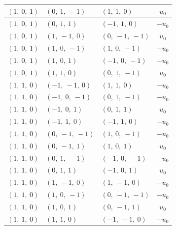 \documentclass[11pt]{article}
\theoremstyle{definition}
\begin{document}
\begin{longtable}{|l|l|l|c|}
    \hline
    $\left( 1, \  0, \  1\right)$ & $\left( 0, \  1, \  -1\right)$ & $\left( 1, \  1, \  0\right)$ & $u_{0}$ \\
    \hline
    $\left( 1, \  0, \  1\right)$ & $\left( 0, \  1, \  1\right)$ & $\left( -1, \  1, \  0\right)$ & $- u_{0}$ \\
    \hline
    $\left( 1, \  0, \  1\right)$ & $\left( 1, \  -1, \  0\right)$ & $\left( 0, \  -1, \  -1\right)$ & $u_{0}$ \\
    \hline
    $\left( 1, \  0, \  1\right)$ & $\left( 1, \  0, \  -1\right)$ & $\left( 1, \  0, \  -1\right)$ & $- u_{0}$ \\
    \hline
    $\left( 1, \  0, \  1\right)$ & $\left( 1, \  0, \  1\right)$ & $\left( -1, \  0, \  -1\right)$ & $- u_{0}$ \\
    \hline
    $\left( 1, \  0, \  1\right)$ & $\left( 1, \  1, \  0\right)$ & $\left( 0, \  1, \  -1\right)$ & $u_{0}$ \\
    \hline
    $\left( 1, \  1, \  0\right)$ & $\left( -1, \  -1, \  0\right)$ & $\left( 1, \  1, \  0\right)$ & $- u_{0}$ \\
    \hline
    $\left( 1, \  1, \  0\right)$ & $\left( -1, \  0, \  -1\right)$ & $\left( 0, \  1, \  -1\right)$ & $- u_{0}$ \\
    \hline
    $\left( 1, \  1, \  0\right)$ & $\left( -1, \  0, \  1\right)$ & $\left( 0, \  1, \  1\right)$ & $u_{0}$ \\
    \hline
    $\left( 1, \  1, \  0\right)$ & $\left( -1, \  1, \  0\right)$ & $\left( -1, \  1, \  0\right)$ & $- u_{0}$ \\
    \hline
    $\left( 1, \  1, \  0\right)$ & $\left( 0, \  -1, \  -1\right)$ & $\left( 1, \  0, \  -1\right)$ & $- u_{0}$ \\
    \hline
    $\left( 1, \  1, \  0\right)$ & $\left( 0, \  -1, \  1\right)$ & $\left( 1, \  0, \  1\right)$ & $u_{0}$ \\
    \hline
    $\left( 1, \  1, \  0\right)$ & $\left( 0, \  1, \  -1\right)$ & $\left( -1, \  0, \  -1\right)$ & $- u_{0}$ \\
    \hline
    $\left( 1, \  1, \  0\right)$ & $\left( 0, \  1, \  1\right)$ & $\left( -1, \  0, \  1\right)$ & $u_{0}$ \\
    \hline
    $\left( 1, \  1, \  0\right)$ & $\left( 1, \  -1, \  0\right)$ & $\left( 1, \  -1, \  0\right)$ & $- u_{0}$ \\
    \hline
    $\left( 1, \  1, \  0\right)$ & $\left( 1, \  0, \  -1\right)$ & $\left( 0, \  -1, \  -1\right)$ & $- u_{0}$ \\
    \hline
    $\left( 1, \  1, \  0\right)$ & $\left( 1, \  0, \  1\right)$ & $\left( 0, \  -1, \  1\right)$ & $u_{0}$ \\
    \hline
    $\left( 1, \  1, \  0\right)$ & $\left( 1, \  1, \  0\right)$ & $\left( -1, \  -1, \  0\right)$ & $- u_{0}$ \\
    \hline
\end{longtable}
\end{document}
